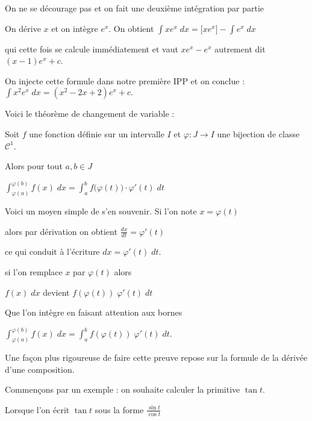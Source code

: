 \change

On ne se décourage pas et on fait une deuxième intégration par partie

On dérive $x$ et on intègre $e^x$.
On obtient  
$\int x e^x \; dx = \big[x e^x\big] - \int e^x \; dx$ 

qui cette fois se calcule immédiatement et vaut $xe^x - e^x$ autrement dit $(x-1)e^x+c$.

\change

On injecte cette formule dans notre première IPP et on 
conclue :
$\int x^2e^x \; dx = (x^2-2x+2) e^x + c.$


\diapo

Voici le théorème de changement de variable :


Soit $f$ une fonction définie sur un intervalle $I$ et $\varphi : J \to I$ une bijection de classe $\mathcal{C}^1$. 

Alors pour tout $a,b\in J$ 

$\int_{\varphi(a)}^{\varphi(b)} f(x) \; dx = \int_a^b f\big(\varphi(t)\big)\cdot\varphi'(t) \; dt$

\change


Voici un moyen simple de s'en souvenir. 
Si l'on note $x=\varphi(t)$ 

\change

alors par dérivation on obtient $\frac{dx}{dt} = \varphi'(t)$

\change

ce qui conduit à l'écriture $dx = \varphi'(t) \; dt$. 

\change 

si l'on remplace $x$ par $\varphi(t)$ alors 

$f(x) \; dx$ devient $f(\varphi(t)) \; \varphi'(t) \; dt$

\change

Que l'on intègre en faisant attention aux bornes

$\int_{\varphi(a)}^{\varphi(b)} f(x) \; dx = \int_a^b f(\varphi(t)) \; \varphi'(t) \; dt$.

Une façon plus rigoureuse de faire cette preuve repose
sur la formule de la dérivée d'une composition.


\diapo

Commençons par un exemple : on souhaite calculer la primitive $\tan t$.

\change

Lorsque l'on écrit $\tan t$ sous la forme  $\frac{\sin t}{\cos t}$ 


